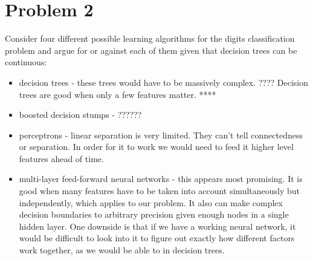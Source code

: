 \documentclass{article}
\begin{document}
\section*{Problem 2}
Consider four different possible learning algorithms for the digits
classification problem and argue for or against each of them given that
decision trees can be continuous: 
\begin{itemize}
\item decision trees - 
 these trees would have to be massively complex. ????
 Decision trees are good when only a few features matter. ****
\item boosted decision stumps - ??????
\item perceptrons - linear separation is very limited. They can't tell 
connectedness or separation. In order for it to work we would need to
feed it higher level features ahead of time.  

\item multi-layer feed-forward neural networks - this appears most promising. 
  It is good when many features have to be taken into account simultaneously
  but independently, which applies to our problem. It also can make complex 
  decision boundaries to arbitrary precision given enough nodes in a single
  hidden layer. One downside is that if we have a working neural network,
  it would be difficult to look into it to figure out exactly how different
  factors work together, as we would be able to in decision trees. 
\end{itemize}
\end{document}
